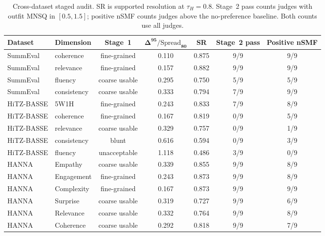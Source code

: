 \begin{table}[ht]
\centering
\small
\setlength{\tabcolsep}{3.5pt}
\caption{Cross-dataset staged audit. SR is supported resolution at $\tau_H=0.8$. Stage~2 pass counts judges with outfit MNSQ in $[0.5,1.5]$; positive nSMF counts judges above the no-preference baseline. Both counts use all judges.}
\label{tab:stage-gates}
\begin{tabular}{llccccc}
\toprule
\textbf{Dataset} & \textbf{Dimension} & \textbf{Stage~1} & $\boldsymbol{\Delta^{95}/\mathrm{Spread}_{80}}$ & \textbf{SR} & \textbf{Stage~2 pass} & \textbf{Positive nSMF} \\
\midrule
SummEval & coherence & fine-grained & 0.110 & 0.875 & 9/9 & 9/9 \\
SummEval & relevance & fine-grained & 0.157 & 0.882 & 9/9 & 9/9 \\
SummEval & fluency & coarse usable & 0.295 & 0.750 & 5/9 & 5/9 \\
SummEval & consistency & coarse usable & 0.333 & 0.794 & 7/9 & 9/9 \\
\midrule
HiTZ-BASSE & 5W1H & fine-grained & 0.243 & 0.833 & 7/9 & 8/9 \\
HiTZ-BASSE & coherence & fine-grained & 0.167 & 0.819 & 0/9 & 5/9 \\
HiTZ-BASSE & relevance & coarse usable & 0.329 & 0.757 & 0/9 & 1/9 \\
HiTZ-BASSE & consistency & blunt & 0.616 & 0.594 & 0/9 & 3/9 \\
HiTZ-BASSE & fluency & unacceptable & 1.118 & 0.486 & 3/9 & 0/9 \\
\midrule
HANNA & Empathy & coarse usable & 0.339 & 0.855 & 9/9 & 8/9 \\
HANNA & Engagement & fine-grained & 0.243 & 0.873 & 9/9 & 8/9 \\
HANNA & Complexity & fine-grained & 0.167 & 0.873 & 9/9 & 9/9 \\
HANNA & Surprise & coarse usable & 0.319 & 0.727 & 9/9 & 6/9 \\
HANNA & Relevance & coarse usable & 0.332 & 0.764 & 9/9 & 8/9 \\
HANNA & Coherence & coarse usable & 0.292 & 0.818 & 9/9 & 7/9 \\
\bottomrule
\end{tabular}
\end{table}
